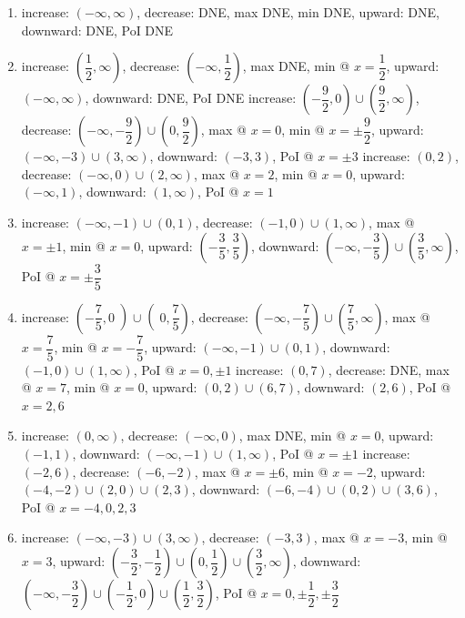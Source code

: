 \documentclass{book}
\begin{document}
\begin{appendices}
\begin{enumerate}[!HW!]
\item increase: $(-\infty,\infty)$, decrease: DNE, max  DNE, min  DNE, upward: DNE, downward: DNE, PoI  DNE
\item increase: $\left(\dfrac{1}{2},\infty\right)$, decrease: $\left(-\infty, \dfrac{1}{2}\right)$, max  DNE, min @ $x=\dfrac{1}{2}$, upward: $(-\infty,\infty)$, downward: DNE, PoI DNE
\itemspade  increase: $\left(-\dfrac{9}{2},0\right)\cup\left(\dfrac{9}{2},\infty\right)$, decrease: \mbox{$\left(-\infty,-\dfrac{9}{2}\right)\cup\left(0,\dfrac{9}{2}\right)$,} max @ $x=0$, min @ $x=\pm\dfrac{9}{2}$, upward: $(-\infty,-3)\cup (3,\infty)$, downward: $(-3,3)$, PoI @ $x=\pm3$
\itemspade  increase: $(0,2)$, decrease: $(-\infty,0)\cup(2,\infty)$, max @ $x=2$, min @ $x=0$, upward: $(-\infty,1)$, downward: $(1,\infty)$, PoI @ $x=1$
\item  increase: $(-\infty,-1)\cup(0,1)$, decrease: $(-1,0)\cup(1,\infty)$, max @ $x=\pm1$, min @ $x=0$, upward: $\left(-\dfrac{3}{5},\dfrac{3}{5}\right)$, downward: \mbox{$\left(-\infty,-\dfrac{3}{5}\right)\cup\left(\dfrac{3}{5},\infty\right)$,} PoI @ $x=\pm\dfrac{3}{5}$
\item  increase: $\left(-\dfrac{7}{5},0\middle)\cup\middle(0,\dfrac{7}{5}\right)$, decrease: \mbox{$\left(-\infty,-\dfrac{7}{5}\right)\cup\left(\dfrac{7}{5},\infty\right)$,} max @ $x=\dfrac{7}{5}$, min @ $x=-\dfrac{7}{5}$, upward: $(-\infty,-1)\cup (0,1)$, downward: $(-1,0)\cup (1,\infty)$, PoI @ $x=0, \pm1$
\itemspade  increase: $(0,7)$, decrease: DNE, max @ $x=7$, min @ $x=0$, upward: $(0,2)\cup (6,7)$, downward: $(2,6)$, PoI @ $x=2,6$
\item  increase: $(0, \infty)$, decrease: $(-\infty,0)$, max  DNE, min @ $x=0$, upward: $(-1,1)$, downward: $(-\infty,-1)\cup(1,\infty)$, PoI @ $x=\pm1$
\itemspade  increase: $(-2,6)$, decrease: $(-6,-2)$, max @ $x=\pm6$, min @ $x=-2$, upward: $(-4,-2)\cup (2,0)\cup(2,3)$, downward: $(-6,-4)\cup(0,2)\cup(3,6)$, PoI @ $x=-4,0,2,3$
\item  increase: $(-\infty,-3)\cup(3,\infty)$, decrease: $(-3,3)$, max @ $x=-3$, min @ $x=3$, upward: $\left(-\dfrac{3}{2}, -\dfrac{1}{2}\right)\cup \left(0,\dfrac{1}{2}\right)\cup \left(\dfrac{3}{2},\infty\right)$, downward: $\left(-\infty,-\dfrac{3}{2}\right)\cup \left(-\dfrac{1}{2},0\right)\cup\left(\dfrac{1}{2},\dfrac{3}{2}\right)$, PoI @ $x=0, \pm\dfrac{1}{2}, \pm\dfrac{3}{2}$

\end{enumerate}
\end{appendices}
\end{document}
